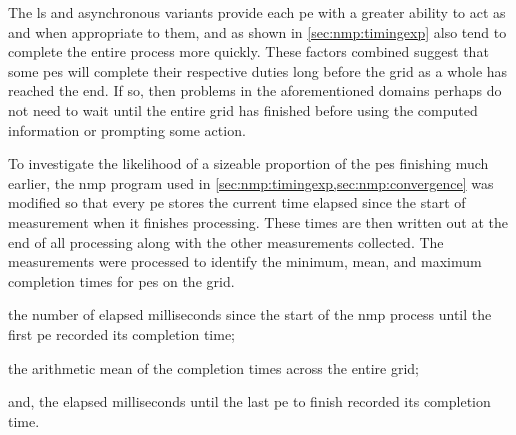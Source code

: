 The \gls{ls} and asynchronous variants provide each \gls{pe} with a greater ability to act as and when appropriate to them, and as shown in \cref{sec:nmp:timingexp} also tend to complete the entire process more quickly.  These factors combined suggest that some \glspl{pe} will complete their respective duties long before the grid as a whole has reached the end.  If so, then problems in the aforementioned domains perhaps do not need to wait until the entire grid has finished before using the computed information or prompting some action.

To investigate the likelihood of a sizeable proportion of the \glspl{pe} finishing much earlier, the \gls{nmp} program used in \cref{sec:nmp:timingexp,sec:nmp:convergence} was modified so that every \gls{pe} stores the current time elapsed since the start of measurement when it finishes processing.  These times are then written out at the end of all processing along with the other measurements collected.  The measurements were processed to identify the minimum, mean, and maximum completion times for \glspl{pe} on the grid.  \ie{}
\begin{inparablank}
\item the number of elapsed milliseconds since the start of the \gls{nmp} process until the first \gls{pe} recorded its completion time;
\item the arithmetic mean of the completion times across the entire grid;
\item and, the elapsed milliseconds until the last \gls{pe} to finish recorded its completion time.
\end{inparablank}

